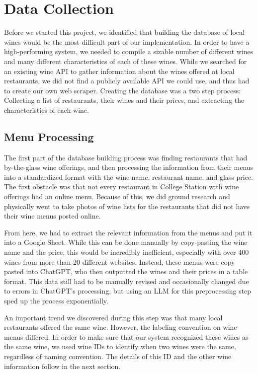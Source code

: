 \documentclass{article} %
\begin{document}
\section{Data Collection}

Before we started this project, we identified that building the database of local wines would be the most difficult part of our implementation. In order to have a high-performing system, we needed to compile a sizable number of different wines and many different characteristics of each of these wines. While we searched for an existing wine API to gather information about the wines offered at local restaurants, we did not find a publicly available API we could use, and thus had to create our own web scraper. Creating the database was a two step process: Collecting a list of restaurants, their wines and their prices, and  extracting the characteristics of each wine.

\subsection{Menu Processing}

The first part of the database building process was finding restaurants that had by-the-glass wine offerings, and then processing the information from their menus into a standardized format with the wine name, restaurant name, and glass price. The first obstacle was that not every restaurant in College Station with wine offerings had an online menu. Because of this, we did ground research and physically went to take photos of wine lists for the restaurants that did not have their wine menus posted online. 

From here, we had to extract the relevant information from the menus and put it into a Google Sheet. While this can be done manually by copy-pasting the wine name and the price, this would be incredibly inefficient, especially with over 400 wines from more than 20 different websites. Instead, these menus were copy pasted into ChatGPT, who then outputted the wines and their prices in a table format. This data still had to be manually revised and occasionally changed due to errors in ChatGPT's processing, but using an LLM for this preprocessing step sped up the process exponentially.

An important trend we discovered during this step was that many local restaurants offered the same wine. However, the labeling convention on wine menus differed. In order to make sure that our system recognized these wines as the same wine, we used wine IDs to identify when two wines were the same, regardless of naming convention. The details of this ID and the other wine information follow in the next section.
\end{document}
